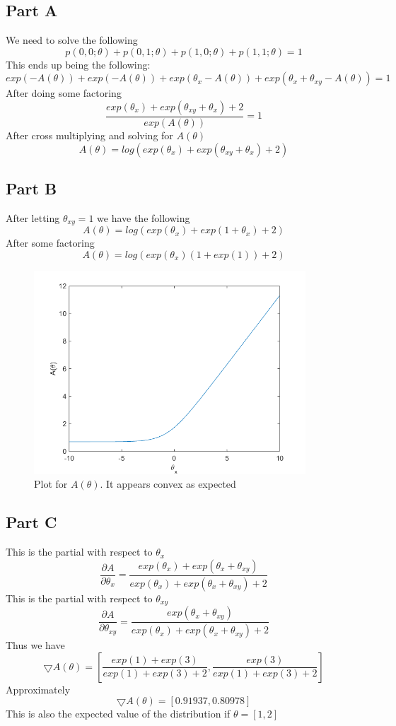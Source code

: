 \documentclass[twoside,11pt]{article}
\theoremstyle{definition}
\begin{document}
\subsection*{Part A}

We need to solve the following
\[
p(0,0;\theta) + p(0,1;\theta) + p(1,0;\theta) + p(1,1;\theta) = 1
\]
This ends up being the following:
\[
exp(-A(\theta)) + exp(-A(\theta)) + exp(\theta_x - A(\theta)) + exp(\theta_x + \theta_{xy} - A(\theta)) = 1
\]
After doing some factoring
\[
\frac{exp(\theta_x) + exp(\theta_{xy} + \theta_x) + 2}{exp(A(\theta))} = 1
\]
After cross multiplying and solving for $A(\theta)$
\[
A(\theta) = log( exp(\theta_x) + exp(\theta_{xy} + \theta_x) + 2 )
\]

\subsection*{Part B}
After letting $\theta_{xy} = 1$ we have the following
\[
A(\theta) = log( exp(\theta_x) + exp(1 + \theta_x) + 2 )
\]
After some factoring
\[
A(\theta) = log( exp(\theta_x)(1 + exp(1) ) + 2 )
\]
\begin{figure}[h]
\centering
\includegraphics[width=4in]{prob3bplot.png}
\caption{Plot for $A(\theta)$. It appears convex as expected}
\end{figure}

\subsection*{Part C}
This is the partial with respect to $\theta_x$
\[
\frac{\partial A}{\partial \theta_x} = \frac{exp(\theta_x) + exp(\theta_x + \theta_{xy})}{exp(\theta_x) + exp(\theta_x + \theta_{xy}) + 2}
\]
This is the partial with respect to $\theta_{xy}$
\[
\frac{\partial A}{\partial \theta_{xy}} = \frac{exp(\theta_x + \theta_{xy})}{exp(\theta_x) + exp(\theta_x + \theta_{xy}) + 2}
\]
Thus we have 
\[
\bigtriangledown A(\theta) = [\frac{exp(1)+exp(3)}{exp(1)+exp(3)+2},\frac{exp(3)}{exp(1)+exp(3)+2}]
\]
Approximately 
\[
\bigtriangledown A(\theta) = [0.91937,0.80978]
\]
This is also the expected value of the distribution if $\theta=[1,2]$
\end{document}

